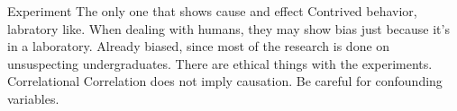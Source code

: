 \markdownRendererUlEndTight \markdownRendererUlItemEnd 
\markdownRendererUlItem Experiment\markdownRendererInterblockSeparator
{}\markdownRendererUlBeginTight
\markdownRendererUlItem The only one that shows cause and effect\markdownRendererUlItemEnd 
\markdownRendererUlItem Contrived behavior, labratory like.\markdownRendererUlItemEnd 
\markdownRendererUlItem When dealing with humans, they may show bias just because it's in a laboratory.\markdownRendererUlItemEnd 
\markdownRendererUlItem Already biased, since most of the research is done on unsuspecting undergraduates.\markdownRendererUlItemEnd 
\markdownRendererUlItem There are ethical things with the experiments.\markdownRendererUlItemEnd 
\markdownRendererUlEndTight \markdownRendererUlItemEnd 
\markdownRendererUlItem Correlational\markdownRendererInterblockSeparator
{}\markdownRendererUlBeginTight
\markdownRendererUlItem Correlation does not imply causation.\markdownRendererUlItemEnd 
\markdownRendererUlItem Be careful for confounding variables.\markdownRendererUlItemEnd 
\markdownRendererUlEndTight \markdownRendererUlItemEnd 
\markdownRendererUlEndTight \relax